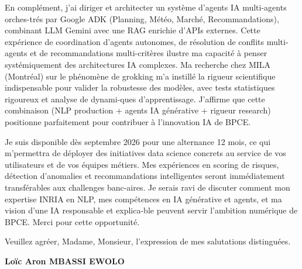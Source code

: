 \documentclass[a4paper,11pt]{article}
\begin{document}
\vspace{0.8em}
\noindent En complément, j'ai diriger et architecter un système d'agents IA multi-agents orches-trés par Google ADK (Planning, Météo, Marché, Recommandations), combinant LLM Gemini avec une RAG enrichie d'APIs externes. Cette expérience de coordination d'agents autonomes, de résolution de conflits multi-agents et de recommandations multi-critères ilustre ma capacité à penser systémiquement des architectures IA complexes. Ma recherche chez MILA (Montréal) sur le phénomène de grokking m'a instillé la rigueur scientifique indispensable pour valider la robustesse des modèles, avec tests statistiques rigoureux et analyse de dynami-ques d'apprentissage. J'affirme que cette combinaison (NLP production + agents IA générative + rigueur research) positionne parfaitement pour contribuer à l'innovation IA de BPCE.

\vspace{0.8em}
\noindent Je suis disponible dès septembre 2026 pour une alternance 12 mois, ce qui m'permettra de déployer des initiatives data science concrets au service de vos utilisateurs et de vos équipes métiers. Mes expériences en scoring de risques, détection d'anomalies et recommandations intelligentes seront immédiatement transférables aux challenges banc-aires. Je serais ravi de discuter comment mon expertise INRIA en NLP, mes compétences en IA générative et agents, et ma vision d'une IA responsable et explica-ble peuvent servir l'ambition numérique de BPCE. Merci pour cette opportunité.

\vspace{1.5em}
\noindent Veuillez agr\'eer, Madame, Monsieur, l'expression de mes salutations distingu\'ees.

\vspace{2em}
\noindent \textbf{Lo\"ic Aron MBASSI EWOLO}
\end{document}
